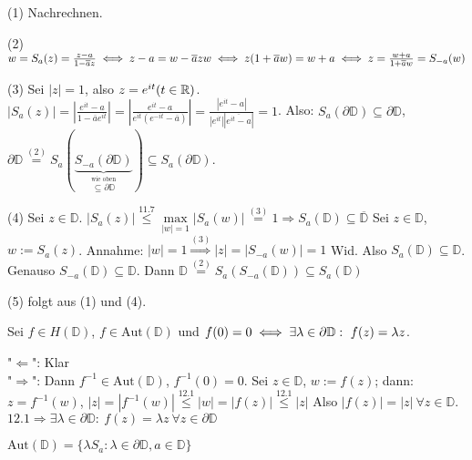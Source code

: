 \documentclass[a4paper,twoside,DIV15,BCOR12mm]{scrbook}
\def\gdw{\equizu}
\def\MdD{\mathbb{D}}
\def\gdw{\equizu}
\begin{document}
\begin{beweis}
\begin{liste}
\item[(1)] Nachrechnen.
\item[(2)] $w = S_a(z) = \frac{z-a}{1-\overline{a}z} \gdw z-a = w - \overline{a}zw \gdw z(1+\overline{a}w) = w+a \gdw z = \frac{w+a}{1+\overline{a}w} = S_{-a}(w)$
\item[(3)] Sei $|z| = 1$, also $z=e^{it} (t\in\mathbb{R})$.$|S_a(z)| = |\frac{e^{it} - a}{1-\overline{a}e^{it}}| = |\frac{e^{it} -a}{e^{it}(e^{-it}-\overline{a})}| = \frac{|e^{it} -a|}{|e^{it}||\overline{e^{it}-a}|} = 1$. Also: $S_a(\partial \MdD) \subseteq \partial \MdD$, $\partial \MdD \stackrel{(2)}{=} S_a( \underbrace{S_{-a}(\partial \MdD)}_{\stackrel{\text{wie oben}}{\subseteq \partial \MdD}} ) \subseteq S_a(\partial \MdD)$.
\item[(4)] Sei $z \in \MdD$. $|S_a(z)| \stackrel{\text{11.7}}{\leq} \max\limits_{|w|=1}|S_a(w)| \stackrel{(3)}{=} 1 \Rightarrow S_a(\MdD) \subseteq \overline{\MdD}$
Sei $z \in \MdD$, $w:=S_a(z)$. Annahme: $|w|=1 \stackrel{(3)}{\Rightarrow} |z| = |S_{-a}(w)| = 1$ Wid.
Also $S_a(\MdD) \subseteq \MdD$. Genauso $S_{-a}(\MdD) \subseteq \MdD$. Dann $\MdD \stackrel{(2)}{=} S_a(S_{-a}(\MdD)) \subseteq S_a(\MdD)$
\item[(5)] folgt aus (1) und (4).
\end{liste}
\end{beweis}

\begin {satz}
 Sei $f \in H(\MdD)$, $f \in \mbox{Aut}(\MdD)$ und $f(0)=0 \equizu \exists \lambda \in \partial \MdD:\ f(z) = \lambda z$.
\end{satz}
\begin{beweis}
  "$\Leftarrow$": Klar \\
  "$\Rightarrow$": Dann $f^{-1} \in \mbox{Aut}(\MdD)$, $f^{-1}(0) = 0$. Sei $z \in \MdD$, $w := f(z)$; dann: \\
   $z = f^{-1}(w)$, $|z| = |f^{-1}(w)| \stackrel{12.1}{\leq} |w| = |f(z)|\stackrel{12.1}{\leq} |z|$ Also 
   $|f(z)| = |z|\  \forall z \in \MdD$. $12.1 \Rightarrow \exists \lambda \in \partial \MdD:\ f(z) = \lambda z\ \forall z \in \partial \MdD$
\end{beweis}

\begin{satz}
 $\mbox{Aut}(\MdD) = \{ \lambda S_a: \lambda \in \partial \MdD, a \in \MdD\}$
\end{satz}
\end{document}

